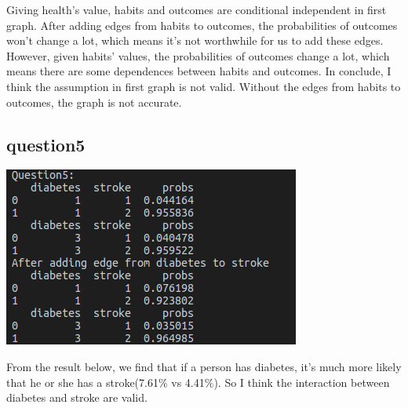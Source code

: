 \documentclass[aps,letterpaper,10pt]{revtex4}
\begin{document}
\par Giving health's value, habits and outcomes are conditional independent in first graph. After adding edges from habits to outcomes, 
the probabilities of outcomes won't change a lot, which means it's not worthwhile for us to add these edges. However, given habits' values, 
the probabilities of outcomes change a lot, which means there are some dependences between habits and outcomes. In conclude, I think the assumption 
in first graph is not valid. Without the edges from habits to outcomes, the graph is not accurate.
\subsection{question5}
\begin{center}
    \includegraphics[scale=0.8]{5.png}
\end{center}
From the result below, we find that if a person has diabetes, it's much more likely that he or she has a stroke(7.61\% vs 4.41\%). So I think the interaction between diabetes and 
stroke are valid. 
\end{document}
